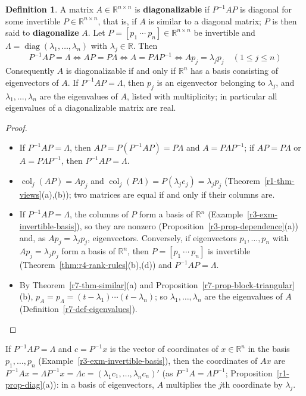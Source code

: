 \documentclass[12pt]{article}
\newcommand{\R}{\mathbb R}
\DeclareMathOperator{\col}{col}
\DeclareMathOperator{\diag}{diag}
\theoremstyle{definition}
\newtheorem{definition}[theorem]{Definition}
\begin{document}
\begin{definition}\label{r7-def-diagonalizable}
A matrix \(A\in\R^{n\times n}\) is \textbf{diagonalizable} if \(P^{-1}AP\) is diagonal for some invertible
\(P\in\R^{n\times n}\), that is, if \(A\) is similar to a diagonal matrix; \(P\) is then said to \textbf{diagonalize}
\(A\). Let \(P=[p_1\ \cdots\ p_n]\in\R^{n\times n}\) be invertible and \(\Lambda=\diag(\lambda_1,\dots,\lambda_n)\) with
\(\lambda_j\in\R\). Then
\[
P^{-1}AP=\Lambda\iff AP=P\Lambda\iff A=P\Lambda P^{-1}\iff Ap_j=\lambda_jp_j\quad(1\leqslant j\leqslant n)
\]
Consequently \(A\) is diagonalizable if and only if \(\R^n\) has a basis consisting of eigenvectors of \(A\). If
\(P^{-1}AP=\Lambda\), then \(p_j\) is an eigenvector belonging to \(\lambda_j\), and \(\lambda_1,\dots,\lambda_n\) are the
eigenvalues of \(A\), listed with multiplicity; in particular all eigenvalues of a diagonalizable matrix are real.
\end{definition}
\begin{proof}
\begin{itemize}
\item If \(P^{-1}AP=\Lambda\), then \(AP=P(P^{-1}AP)=P\Lambda\) and \(A=P\Lambda P^{-1}\); if \(AP=P\Lambda\) or
\(A=P\Lambda P^{-1}\), then \(P^{-1}AP=\Lambda\).
\item \(\col_j(AP)=Ap_j\) and \(\col_j(P\Lambda)=P(\lambda_je_j)=\lambda_jp_j\) (Theorem~\ref{r1-thm-views}(a),(b)); two
matrices are equal if and only if their columns are.
\item If \(P^{-1}AP=\Lambda\), the columns of \(P\) form a basis of \(\R^n\) (Example~\ref{r3-exm-invertible-basis}), so they
are nonzero (Proposition~\ref{r3-prop-dependence}(a)) and, as \(Ap_j=\lambda_jp_j\), eigenvectors. Conversely, if
eigenvectors \(p_1,\dots,p_n\) with \(Ap_j=\lambda_jp_j\) form a basis of \(\R^n\), then \(P=[p_1\ \cdots\ p_n]\) is invertible
(Theorem~\ref{thm:r4-rank-rules}(b),(d)) and \(P^{-1}AP=\Lambda\).
\item By Theorem~\ref{r7-thm-similar}(a) and Proposition~\ref{r7-prop-block-triangular}(b),
\(p_A=p_\Lambda=(t-\lambda_1)\cdots(t-\lambda_n)\); so \(\lambda_1,\dots,\lambda_n\) are the eigenvalues of \(A\)
(Definition~\ref{r7-def-eigenvalues}).\qedhere
\end{itemize}
\end{proof}
If \(P^{-1}AP=\Lambda\) and \(c=P^{-1}x\) is the vector of coordinates of \(x\in\R^n\) in the basis \(p_1,\dots,p_n\)
(Example~\ref{r3-exm-invertible-basis}), then the coordinates of \(Ax\) are
\(P^{-1}Ax=\Lambda P^{-1}x=\Lambda c=(\lambda_1c_1,\dots,\lambda_nc_n)'\) (as \(P^{-1}A=\Lambda P^{-1}\); Proposition~\ref{r1-prop-diag}(a)):
in a basis of eigenvectors, \(A\) multiplies the \(j\)th coordinate by \(\lambda_j\).
\end{document}
